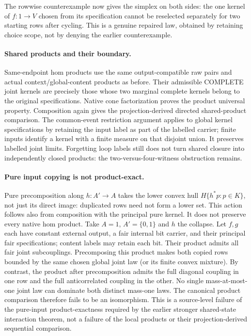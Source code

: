 \documentclass{article}
\begin{document}
The rowwise counterexample now gives the simplex on both sides: the one kernel of $f:1\to V$ chosen from its specification cannot be reselected separately for two starting rows after cycling. This is a genuine repaired law, obtained by retaining choice scope, not by denying the earlier counterexample.

\paragraph{Shared products and their boundary.} Same-endpoint hom products use the same output-compatible raw pairs and actual context/global-content products as before. Their admissible COMPLETE joint kernels are precisely those whose two marginal complete kernels belong to the original specifications. Native cone factorization proves the product universal property. Composition again gives the projection-derived directed shared-product comparison. The common-event restriction argument applies to global kernel specifications by retaining the input label as part of the labelled carrier; finite inputs identify a kernel with a finite measure on that disjoint union. It preserves labelled joint limits. Forgetting loop labels still does not turn shared closure into independently closed products: the two-versus-four-witness obstruction remains.

\paragraph{Pure input copying is not product-exact.} Pure precomposition along $h:A'\to A$ takes the lower convex hull $H\{h^*p:p\in K\}$, not just its direct image: duplicated rows need not form a lower set. This action follows also from composition with the principal pure kernel. It does not preserve every native hom product. Take $A=1$, $A'=\{0,1\}$ and $h$ the collapse. Let $f,g$ each have constant external output, a fair internal bit carrier, and their principal fair specifications; content labels may retain each bit. Their product admits all fair joint subcouplings. Precomposing this product makes both copied rows bounded by the same chosen global joint law (or its finite convex mixture). By contrast, the product after precomposition admits the full diagonal coupling in one row and the full anticorrelated coupling in the other. No single mass-at-most-one joint law can dominate both distinct mass-one laws. The canonical product comparison therefore fails to be an isomorphism. This is a source-level failure of the pure-input product-exactness required by the earlier stronger shared-state interaction theorem, not a failure of the local products or their projection-derived sequential comparison.
\end{document}
